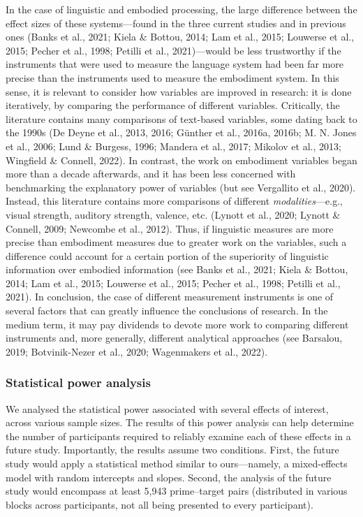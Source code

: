 \documentclass[
  12pt,
  man,floatsintext]{apa7}
\begin{document}
In the case of linguistic and embodied processing, the large difference between the effect sizes of these systems---found in the three current studies and in previous ones (Banks et al., 2021; Kiela \& Bottou, 2014; Lam et al., 2015; Louwerse et al., 2015; Pecher et al., 1998; Petilli et al., 2021)---would be less trustworthy if the instruments that were used to measure the language system had been far more precise than the instruments used to measure the embodiment system. In this sense, it is relevant to consider how variables are improved in research: it is done iteratively, by comparing the performance of different variables. Critically, the literature contains many comparisons of text-based variables, some dating back to the 1990s (De Deyne et al., 2013, 2016; Günther et al., 2016a, 2016b; M. N. Jones et al., 2006; Lund \& Burgess, 1996; Mandera et al., 2017; Mikolov et al., 2013; Wingfield \& Connell, 2022). In contrast, the work on embodiment variables began more than a decade afterwards, and it has been less concerned with benchmarking the explanatory power of variables (but see Vergallito et al., 2020). Instead, this literature contains more comparisons of different \emph{modalities}---e.g., visual strength, auditory strength, valence, etc. (Lynott et al., 2020; Lynott \& Connell, 2009; Newcombe et al., 2012). Thus, if linguistic measures are more precise than embodiment measures due to greater work on the variables, such a difference could account for a certain portion of the superiority of linguistic information over embodied information (see Banks et al., 2021; Kiela \& Bottou, 2014; Lam et al., 2015; Louwerse et al., 2015; Pecher et al., 1998; Petilli et al., 2021). In conclusion, the case of different measurement instruments is one of several factors that can greatly influence the conclusions of research. In the medium term, it may pay dividends to devote more work to comparing different instruments and, more generally, different analytical approaches (see Barsalou, 2019; Botvinik-Nezer et al., 2020; Wagenmakers et al., 2022).

\hypertarget{statistical-power-analysis-3}{%
\subsubsection{Statistical power analysis}\label{statistical-power-analysis-3}}

We analysed the statistical power associated with several effects of interest, across various sample sizes. The results of this power analysis can help determine the number of participants required to reliably examine each of these effects in a future study. Importantly, the results assume two conditions. First, the future study would apply a statistical method similar to ours---namely, a mixed-effects model with random intercepts and slopes. Second, the analysis of the future study would encompass at least 5,943 prime--target pairs (distributed in various blocks across participants, not all being presented to every participant).
\end{document}

